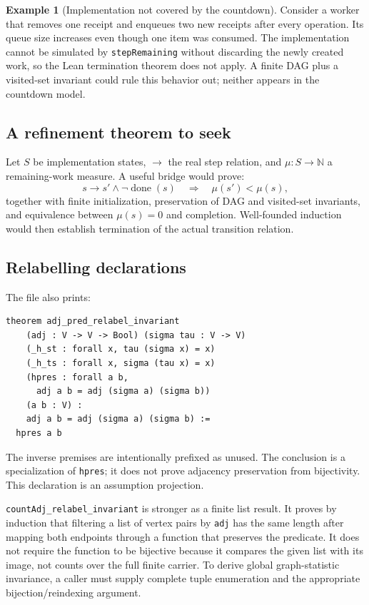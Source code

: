 \documentclass[10pt,letterpaper]{article}
\theoremstyle{definition}
\newtheorem{example}[theorem]{Example}
\begin{document}
\begin{example}[Implementation not covered by the countdown]
Consider a worker that removes one receipt and enqueues two new receipts after
every operation. Its queue size increases even though one item was consumed.
The implementation cannot be simulated by \texttt{stepRemaining} without
discarding the newly created work, so the Lean termination theorem does not
apply. A finite DAG plus a visited-set invariant could rule this behavior out;
neither appears in the countdown model.
\end{example}

\subsection{A refinement theorem to seek}
Let \(S\) be implementation states, \(\to\) the real step relation, and
\(\mu:S\to\mathbb{N}\) a remaining-work measure. A useful bridge would prove:
\[
s\to s' \land \neg\operatorname{done}(s)
\quad\Longrightarrow\quad
\mu(s')<\mu(s),
\]
together with finite initialization, preservation of DAG and visited-set
invariants, and equivalence between \(\mu(s)=0\) and completion. Well-founded
induction would then establish termination of the actual transition relation.

\subsection{Relabelling declarations}
The file also prints:
\begin{lstlisting}[language={},caption={The core relabelling premise and conclusion.}]
theorem adj_pred_relabel_invariant
    (adj : V -> V -> Bool) (sigma tau : V -> V)
    (_h_st : forall x, tau (sigma x) = x)
    (_h_ts : forall x, sigma (tau x) = x)
    (hpres : forall a b,
      adj a b = adj (sigma a) (sigma b))
    (a b : V) :
    adj a b = adj (sigma a) (sigma b) :=
  hpres a b
\end{lstlisting}
The inverse premises are intentionally prefixed as unused. The conclusion is a
specialization of \texttt{hpres}; it does not prove adjacency preservation from
bijectivity. This declaration is an assumption projection.

\texttt{countAdj\_relabel\_invariant} is stronger as a finite list result. It
proves by induction that filtering a list of vertex pairs by \texttt{adj} has
the same length after mapping both endpoints through a function that preserves
the predicate. It does not require the function to be bijective because it
compares the given list with its image, not counts over the full finite carrier.
To derive global graph-statistic invariance, a caller must supply complete tuple
enumeration and the appropriate bijection/reindexing argument.
\end{document}
